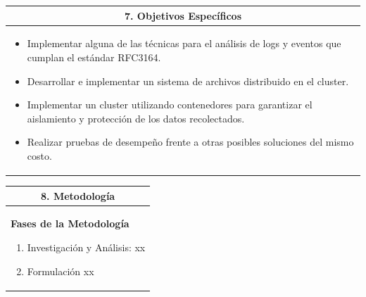 \documentclass[letter,12pt]{article}
\begin{document}

\begin{center}
\begin{tabular}{|p{15.5cm}|}
\hline
\multicolumn{1}{|c|}{ \textbf{7. Objetivos Específicos}}\\
\hline
\begin{itemize}
	\item Implementar alguna de las técnicas para el análisis de logs y eventos que cumplan el estándar RFC3164.
	\item Desarrollar e implementar un sistema de archivos distribuido en el cluster.
	\item Implementar un cluster utilizando contenedores para garantizar el aislamiento y protección de los datos recolectados.
    \item Realizar pruebas de desempeño frente a otras posibles soluciones del mismo costo.
\end{itemize} \\
\hline
\end{tabular}
\end{center}


\begin{center}
\begin{tabular}{|p{15.5cm}|}
\hline
\multicolumn{1}{|c|}{ \textbf{8. Metodología} }\\
\hline
\textbf{Fases de la Metodología}
    \begin{enumerate}
        \item Investigación y Análisis:
        xx
        \item Formulación
		xx
        \end{enumerate}\\
        
\hline
\end{tabular}
\end{center}
\end{document}
